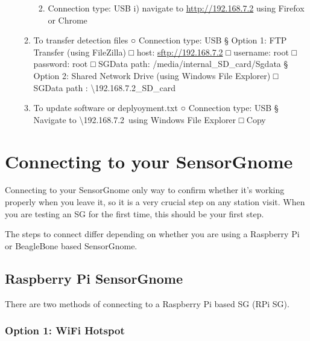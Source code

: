 \documentclass[
]{book}
\providecommand{\tightlist}{%
  \setlength{\itemsep}{0pt}\setlength{\parskip}{0pt}}
\begin{document}
\begin{enumerate}
\begin{enumerate}
    \begin{enumerate}
    \def\labelenumiii{\alph{enumiii})}
    \tightlist
    \item
      Connection type: USB
      i) navigate to \url{http://192.168.7.2} using Firefox or Chrome
    \end{enumerate}
  \item
    To transfer detection files
    ○ Connection type: USB
    § Option 1: FTP Transfer (using FileZilla)
    □ host: \url{sftp://192.168.7.2}
    □ username: root
    □ password: root
    □ SGData path: /media/internal\_SD\_card/Sgdata
    § Option 2: Shared Network Drive (using Windows File Explorer)
    □ SGData path : \textbackslash192.168.7.2\data\internal\_SD\_card\SGdata 
  \item
    To update software or deplyoyment.txt
    ○ Connection type: USB
    § Navigate to \textbackslash192.168.7.2\root\boot\uboot~using Windows File Explorer
    □ Copy
  \end{enumerate}
\end{enumerate}

\hypertarget{connecting-to-your-sensorgnome}{%
\chapter{Connecting to your SensorGnome}\label{connecting-to-your-sensorgnome}}

Connecting to your SensorGnome only way to confirm whether it's working properly when you leave it, so it is a very crucial step on any station visit. When you are testing an SG for the first time, this should be your first step.

The steps to connect differ depending on whether you are using a Raspberry Pi or BeagleBone based SensorGnome.

\hypertarget{raspberry-pi-sensorgnome}{%
\section{Raspberry Pi SensorGnome}\label{raspberry-pi-sensorgnome}}

There are two methods of connecting to a Raspberry Pi based SG (RPi SG).

\hypertarget{option-1-wifi-hotspot}{%
\subsection{Option 1: WiFi Hotspot}\label{option-1-wifi-hotspot}}
\end{document}
